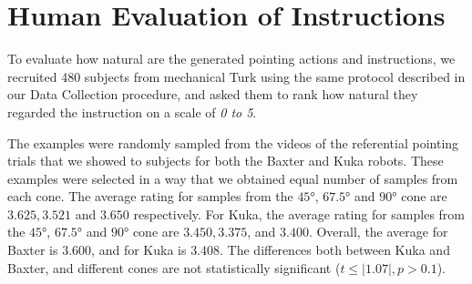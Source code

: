 \section{Human Evaluation of Instructions}

To evaluate how natural are the generated pointing actions and instructions, we recruited 480 subjects from mechanical Turk using the same protocol described in our Data Collection procedure, and asked them to rank how natural they regarded the instruction on a scale of \textit{0 to 5}. 


The examples were randomly sampled from the videos of the referential pointing trials that we showed to subjects for both the Baxter and Kuka robots. These examples were selected in a way that we obtained equal number of samples from each cone. The average rating for samples from the $\ang{45}$, $\ang{67.5}$ and $\ang{90}$ cone are $3.625, 3.521$
and $3.650$ respectively. For Kuka, the average rating for samples from the $\ang{45}$, $\ang{67.5}$ and $\ang{90}$ cone are $3.450, 3.375$, and $3.400$. Overall, the average for Baxter is $3.600$, and for Kuka is $3.408$. The differences both between Kuka and Baxter, and different cones are not statistically significant ($t \leq |1.07|, p > 0.1 $).
